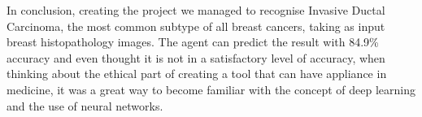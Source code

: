In conclusion, creating the project we managed to recognise Invasive Ductal Carcinoma, the most common subtype of all breast cancers, taking as input breast histopathology images. The agent can predict the result with 84.9\% accuracy and even thought it is not in a satisfactory level of accuracy, when thinking about the ethical part of creating a tool that can have appliance in medicine, it was a great way to become familiar with the concept of deep learning and the use of neural networks.